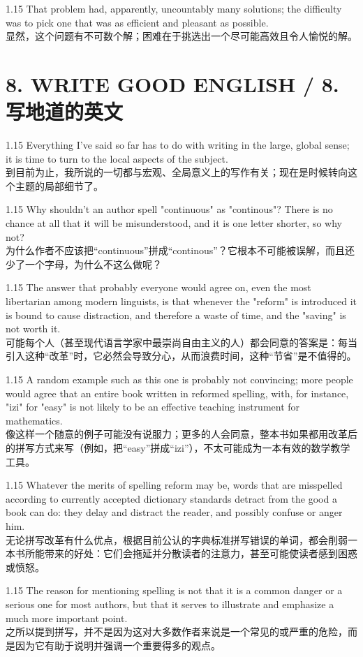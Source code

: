 \documentclass[12pt,a4paper]{article}
\newcommand{\bilingual}[2]{
    \begin{spacing}{1.15} %
        \noindent \normalsize #1 \\[-0.5ex] %
        \small \textcolor{blue!70!black}{#2} %
    \end{spacing}
    \vspace{0.8em} %
}
\begin{document}
\bilingual{That problem had, apparently, uncountably many solutions; the difficulty was to pick one that was as efficient and pleasant as possible.}
{显然，这个问题有不可数个解；困难在于挑选出一个尽可能高效且令人愉悦的解。} %


\section*{8. WRITE GOOD ENGLISH / 8. 写地道的英文} %

\bilingual{Everything I've said so far has to do with writing in the large, global sense; it is time to turn to the local aspects of the subject.}
{到目前为止，我所说的一切都与宏观、全局意义上的写作有关；现在是时候转向这个主题的局部细节了。} %

\bilingual{Why shouldn't an author spell "continuous" as "continous"? There is no chance at all that it will be misunderstood, and it is one letter shorter, so why not?}
{为什么作者不应该把“continuous”拼成“continous”？它根本不可能被误解，而且还少了一个字母，为什么不这么做呢？} %

\bilingual{The answer that probably everyone would agree on, even the most libertarian among modern linguists, is that whenever the "reform" is introduced it is bound to cause distraction, and therefore a waste of time, and the "saving" is not worth it.}
{可能每个人（甚至现代语言学家中最崇尚自由主义的人）都会同意的答案是：每当引入这种“改革”时，它必然会导致分心，从而浪费时间，这种“节省”是不值得的。} %

\bilingual{A random example such as this one is probably not convincing; more people would agree that an entire book written in reformed spelling, with, for instance, "izi" for "easy" is not likely to be an effective teaching instrument for mathematics.}
{像这样一个随意的例子可能没有说服力；更多的人会同意，整本书如果都用改革后的拼写方式来写（例如，把“easy”拼成“izi”），不太可能成为一本有效的数学教学工具。} %

\bilingual{Whatever the merits of spelling reform may be, words that are misspelled according to currently accepted dictionary standards detract from the good a book can do: they delay and distract the reader, and possibly confuse or anger him.}
{无论拼写改革有什么优点，根据目前公认的字典标准拼写错误的单词，都会削弱一本书所能带来的好处：它们会拖延并分散读者的注意力，甚至可能使读者感到困惑或愤怒。} %

\bilingual{The reason for mentioning spelling is not that it is a common danger or a serious one for most authors, but that it serves to illustrate and emphasize a much more important point.}
{之所以提到拼写，并不是因为这对大多数作者来说是一个常见的或严重的危险，而是因为它有助于说明并强调一个重要得多的观点。} %
\end{document}
